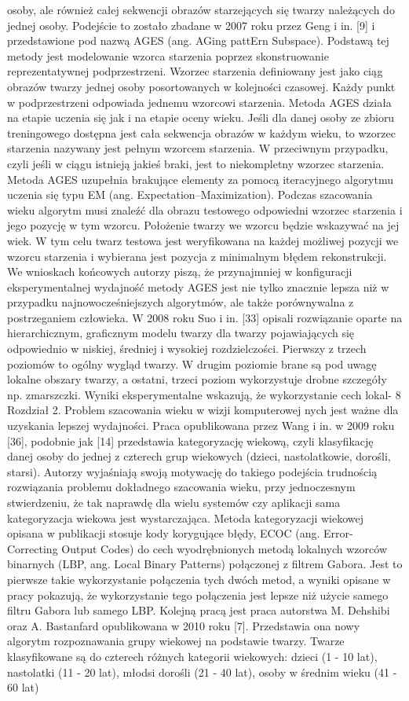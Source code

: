 osoby, ale również całej sekwencji obrazów starzejących się twarzy należących do jednej osoby. Podejście to zostało zbadane w 2007 roku przez Geng i in. [9] i przedstawione pod nazwą AGES (ang. AGing pattErn Subspace). Podstawą tej metody jest modelowanie wzorca starzenia poprzez skonstruowanie reprezentatywnej podprzestrzeni. Wzorzec starzenia definiowany jest jako ciąg obrazów twarzy jednej osoby posortowanych w kolejności czasowej. Każdy punkt w podprzestrzeni odpowiada jednemu wzorcowi starzenia. Metoda AGES działa na etapie uczenia się jak i na etapie oceny wieku. Jeśli dla danej osoby ze zbioru treningowego dostępna jest cała sekwencja obrazów w każdym wieku, to wzorzec starzenia nazywany jest pełnym wzorcem starzenia. W przeciwnym przypadku, czyli jeśli w ciągu istnieją jakieś braki, jest to niekompletny wzorzec starzenia. Metoda AGES uzupełnia brakujące elementy za pomocą iteracyjnego algorytmu uczenia się typu EM (ang. Expectation–Maximization). Podczas szacowania wieku algorytm musi znaleźć dla obrazu testowego odpowiedni wzorzec starzenia i jego pozycję w tym wzorcu. Położenie twarzy we wzorcu będzie wskazywać na jej wiek. W tym celu twarz testowa jest weryfikowana na każdej możliwej pozycji we wzorcu starzenia i wybierana jest pozycja z minimalnym błędem rekonstrukcji. We wnioskach końcowych autorzy piszą, że przynajmniej w konfiguracji eksperymentalnej wydajność metody AGES jest nie tylko znacznie lepsza niż w przypadku najnowocześniejszych algorytmów, ale także porównywalna z postrzeganiem człowieka. W 2008 roku Suo i in. [33] opisali rozwiązanie oparte na hierarchicznym, graficznym modelu twarzy dla twarzy pojawiających się odpowiednio w niskiej, średniej i wysokiej rozdzielczości. Pierwszy z trzech poziomów to ogólny wygląd twarzy. W drugim poziomie brane są pod uwagę lokalne obszary twarzy, a ostatni, trzeci poziom wykorzystuje drobne szczegóły np. zmarszczki. Wyniki eksperymentalne wskazują, że wykorzystanie cech lokal- 8 Rozdział 2. Problem szacowania wieku w wizji komputerowej nych jest ważne dla uzyskania lepszej wydajności. Praca opublikowana przez Wang i in. w 2009 roku [36], podobnie jak [14] przedstawia kategoryzację wiekową, czyli klasyfikację danej osoby do jednej z czterech grup wiekowych (dzieci, nastolatkowie, dorośli, starsi). Autorzy wyjaśniają swoją motywację do takiego podejścia trudnością rozwiązania problemu dokładnego szacowania wieku, przy jednoczesnym stwierdzeniu, że tak naprawdę dla wielu systemów czy aplikacji sama kategoryzacja wiekowa jest wystarczająca. Metoda kategoryzacji wiekowej opisana w publikacji stosuje kody korygujące błędy, ECOC (ang. Error-Correcting Output Codes) do cech wyodrębnionych metodą lokalnych wzorców binarnych (LBP, ang. Local Binary Patterns) połączonej z filtrem Gabora. Jest to pierwsze takie wykorzystanie połączenia tych dwóch metod, a wyniki opisane w pracy pokazują, że wykorzystanie tego połączenia jest lepsze niż użycie samego filtru Gabora lub samego LBP. Kolejną pracą jest praca autorstwa M. Dehshibi oraz A. Bastanfard opublikowana w 2010 roku [7]. Przedstawia ona nowy algorytm rozpoznawania grupy wiekowej na podstawie twarzy. Twarze klasyfikowane są do czterech różnych kategorii wiekowych: dzieci (1 - 10 lat), nastolatki (11 - 20 lat), młodsi dorośli (21 - 40 lat), osoby w średnim wieku (41 - 60 lat) 